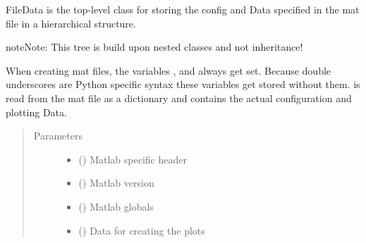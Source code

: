 \documentclass[letterpaper,10pt,english]{sphinxmanual}
\begin{document}
\begin{fulllineitems}
\label{\detokenize{DataAnalyzer.Data:DataAnalyzer.Data.cl_data.FileData}}
FileData is the top-level class for storing the config and Data specified in the mat file in a hierarchical
structure.

\begin{sphinxadmonition}{note}{Note:}
This tree is build upon nested classes and not inheritance!
\end{sphinxadmonition}

When creating mat files, the variables ,  and  always get set. Because
double underscores are Python specific syntax these variables get stored without them.  is read
from the mat file as a dictionary and contains the actual configuration and plotting Data.
\begin{quote}\begin{description}
\item[{Parameters}] \leavevmode\begin{itemize}
\item {} 
 () \textendash{} Matlab specific header

\item {} 
 () \textendash{} Matlab version

\item {} 
 () \textendash{} Matlab globals

\item {} 
 () \textendash{} Data for creating the plots

\end{itemize}

\end{description}\end{quote}


\end{fulllineitems}
\end{document}
